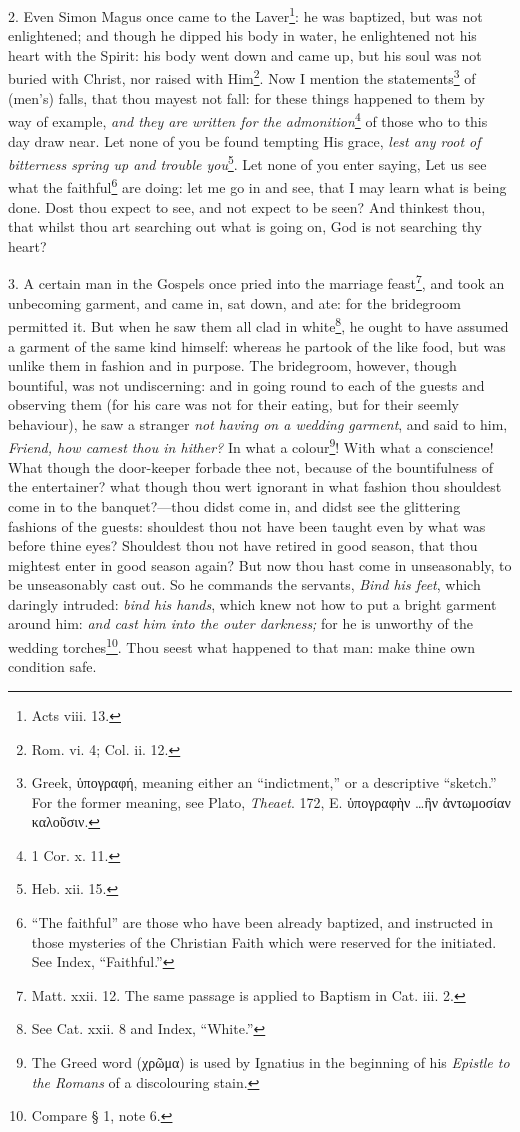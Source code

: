 2. Even Simon Magus once came to the Laver\footnote{Acts viii. 13.}: he was baptized, but was not enlightened; and though he dipped his body in water, he enlightened not his heart with the Spirit: his body went down and came up, but his soul was not buried with Christ, nor raised with Him\footnote{Rom. vi. 4; Col. ii. 12.}. Now I mention the statements\footnote{Greek, \textgreek{ὑπογραφή}, meaning either an “indictment,” or a descriptive “sketch.” For the former meaning, see Plato, \emph{Theaet}. 172, E. \textgreek{ὑπογραφὴν …ἣν ἀντωμοσίαν καλοῦσιν}.} of (men’s) falls, that thou mayest not fall: for these things happened to them by way of example, \emph{and they are written for the admonition}\footnote{1 Cor. x. 11.} of those who to this day draw near. Let none of you be found tempting His grace, \emph{lest any root of bitterness spring up and trouble you}\footnote{Heb. xii. 15.}. Let none of you enter saying, Let us see what the faithful\footnote{“The faithful” are those who have been already baptized, and instructed in those mysteries of the Christian Faith which were reserved for the initiated. See Index, “Faithful.”} are doing: let me go in and see, that I may learn what is being done. Dost thou expect to see, and not expect to be seen? And thinkest thou, that whilst thou art searching out what is going on, God is not searching thy heart?

3. A certain man in the Gospels once pried into the marriage feast\footnote{Matt. xxii. 12. The same passage is applied to Baptism in Cat. iii. 2.}, and took an unbecoming garment, and came in, sat down, and ate: for the bridegroom permitted it. But when he saw them all clad in white\footnote{See Cat. xxii. 8 and Index, “White.”}, he ought to have assumed a garment of the same kind himself: whereas he partook of the like food, but was unlike them in fashion and in purpose. The bridegroom, however, though bountiful, was not undiscerning: and in going round to each of the guests and observing them (for his care was not for their eating, but for their seemly behaviour), he saw a stranger \emph{not having on a wedding garment}, and said to him, \emph{Friend, how camest thou in hither?} In what a colour\footnote{The Greed word (\textgreek{χρῶμα}) is used by Ignatius in the beginning of his \emph{Epistle to the Romans} of a discolouring stain.}! With what a conscience! What though the door-keeper forbade thee not, because of the bountifulness of the entertainer? what though thou wert ignorant in what fashion thou shouldest come in to the banquet?—thou didst come in, and didst see the glittering fashions of the guests: shouldest thou not have been taught even by what was before thine eyes? Shouldest thou not have retired in good season, that thou mightest enter in good season again? But now thou hast come in unseasonably, to be unseasonably cast out. So he commands the servants, \emph{Bind his feet}, which daringly intruded: \emph{bind his hands}, which knew not how to put a bright garment around him: \emph{and cast him into the outer darkness;} for he is unworthy of the wedding torches\footnote{Compare § 1, note 6.}. Thou seest what happened to that man: make thine own condition safe.

